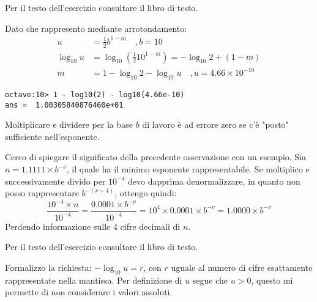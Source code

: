 \begin{exercise}[1.8]
Per il testo dell'esercizio consultare il libro di testo.
\end{exercise}
Dato che rappresento mediante arrotondamento:
\begin{displaymath}
\begin{split}
u &= \frac{1}{2}b^{1-m} \quad , b = 10 \\
\log_{10}{u} &= \log_{10}{\left ( \frac{1}{2}10^{1-m} \right )} = -\log_{10}{2} + (1 - m) \\
m &= 1 - \log_{10}{2} - \log_{10}{u} \quad , u = 4.66 \times 10^{-10}
\end{split}
\end{displaymath}
\begin{lstlisting}
octave:10> 1 - log10(2) - log10(4.66e-10)
ans =  1.00305840876460e+01
\end{lstlisting}

\begin{oss}
Moltiplicare e dividere per la base $b$ di lavoro \`e ad errore zero se c'\`e 
"posto" sufficiente nell'esponente.
\end{oss}
Cerco di spiegare il significato della precedente osservazione con un esempio.
Sia $n = 1.1111 \times b^{-\nu}$, il quale ha il minimo esponente rappresentabile. Se 
moltiplico e successivamente divido per $10^{-4}$ devo dapprima denormalizzare, 
in quanto non posso rappresentare $b^{-(\nu + 4)}$, ottengo quindi:
\begin{displaymath}
	\frac{10^{-4} \times n}{10^{-4}} = \frac{0.0001 \times b^{-\nu}}{10^{-4}} = 
		10^{4} \times 0.0001 \times b^{-\nu} = 1.0000 \times b^{-\nu}
\end{displaymath}
Perdendo informazione sulle 4 cifre decimali di $n$.

\begin{exercise}[1.9]
Per il testo dell'esercizio consultare il libro di testo.
\end{exercise}
Formalizzo la richiesta: $-\log_{10}{u} = r$, con $r$ uguale al numero di cifre
esattamente rappresentate nella mantissa. Per definizione di $u$ segue che $u > 0$,
questo mi permette di non considerare i valori assoluti.

